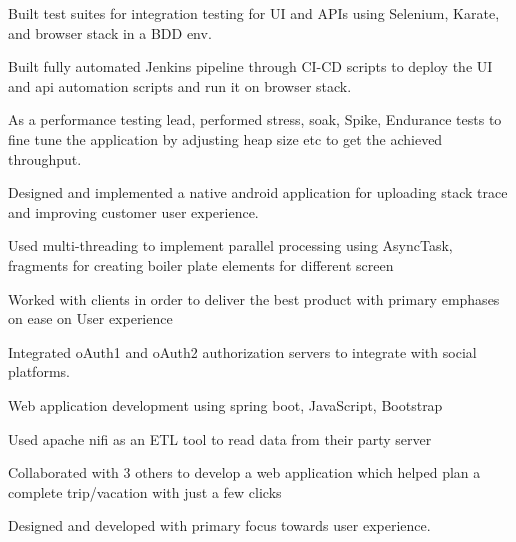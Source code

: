 \documentclass[]{deedy-resume-openfont}
\begin{document}
\begin{minipage}[t]{0.66\textwidth}
\vspace{\topsep} %
\begin{tightemize}
\item Built test suites for integration testing for UI and APIs using Selenium, Karate, and browser stack in a BDD env.
\item Built fully automated Jenkins pipeline through CI-CD scripts to deploy the UI and api automation scripts and run it on browser stack.
\item As a performance testing lead, performed stress, soak, Spike, Endurance tests to fine tune the application by adjusting heap size etc to get the achieved throughput. 
\end{tightemize}
\sectionsep

\begin{tightemize}
\item  Designed and implemented a native android application for uploading stack
trace and improving customer user experience.
\item Used multi-threading to implement parallel processing using AsyncTask,
fragments for creating boiler plate elements for different screen
\item Worked with clients in order to deliver the best product with primary emphases on ease on User experience
\item Integrated oAuth1 and oAuth2 authorization servers to integrate with social platforms.
\end{tightemize}
\sectionsep

\begin{tightemize}
\item Web application development using spring boot, JavaScript, Bootstrap
\item Used apache nifi as an ETL tool to read data from their party server
\end{tightemize}
\sectionsep

\begin{tightemize}
\item Collaborated with 3 others to develop a web application which helped plan a
complete trip/vacation with just a few clicks
\item Designed and developed with primary focus towards user experience.
\end{tightemize}
\sectionsep




\end{minipage} 
\end{document}
